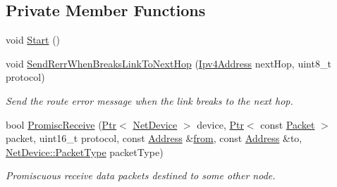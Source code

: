\subsection*{Private Member Functions}
\begin{DoxyCompactItemize}
\item 
void \hyperlink{classns3_1_1dsr_1_1DsrRouting_aa97c9bcf61e5623297563965740a8559}{Start} ()
\item 
void \hyperlink{classns3_1_1dsr_1_1DsrRouting_a0783bd1b2eb30dad7e578236cdac1388}{Send\+Rerr\+When\+Breaks\+Link\+To\+Next\+Hop} (\hyperlink{classns3_1_1Ipv4Address}{Ipv4\+Address} next\+Hop, uint8\+\_\+t protocol)
\begin{DoxyCompactList}\small\item\em Send the route error message when the link breaks to the next hop. \end{DoxyCompactList}\item 
bool \hyperlink{classns3_1_1dsr_1_1DsrRouting_a95d4ab6177fb07d4791a2ed82cd4a2bb}{Promisc\+Receive} (\hyperlink{classns3_1_1Ptr}{Ptr}$<$ \hyperlink{classns3_1_1NetDevice}{Net\+Device} $>$ device, \hyperlink{classns3_1_1Ptr}{Ptr}$<$ const \hyperlink{classns3_1_1Packet}{Packet} $>$ packet, uint16\+\_\+t protocol, const \hyperlink{classns3_1_1Address}{Address} \&\hyperlink{lte__amc_8m_a1b4c81ff74eb1a626b5ade44c81004b3}{from}, const \hyperlink{classns3_1_1Address}{Address} \&to, \hyperlink{classns3_1_1NetDevice_ace65153f09144f55a0d3e702fc29d6b2}{Net\+Device\+::\+Packet\+Type} packet\+Type)
\begin{DoxyCompactList}\small\item\em Promiscuous receive data packets destined to some other node. \end{DoxyCompactList}\end{DoxyCompactItemize}
